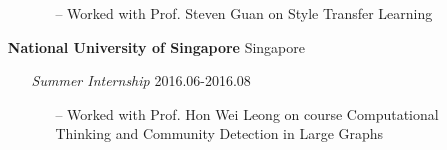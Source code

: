 \documentclass[11pt]{article}
\begin{document}
\begin{itemize}[leftmargin=0em]
\begin{itemize}[noitemsep, nolistsep, leftmargin=0em]
\begin{itemize}
                \item[--] Worked with Prof. Steven Guan on Style Transfer Learning
             \end{itemize}
        \end{itemize} 
    \item[] \large\textbf{National University of Singapore} \hfill Singapore
        \begin{itemize}[noitemsep, nolistsep, leftmargin=0em]
            \item[] \large\emph{Summer Internship} \hfill 2016.06-2016.08
            \begin{itemize}
                \item[--] Worked with Prof. Hon Wei Leong on course Computational Thinking and Community Detection in Large Graphs
            \end{itemize}
        \end{itemize} 
\end{itemize}
\end{document}
